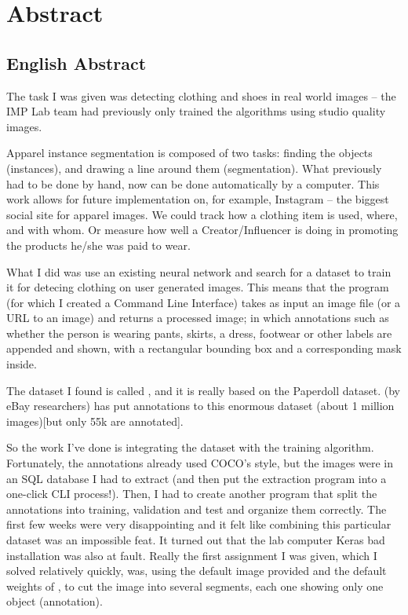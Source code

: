 \chapter*{Abstract}
\section*{English Abstract}

The task I was given was detecting clothing and shoes in real world images -- the IMP Lab team had previously only trained the algorithms using studio quality images.

Apparel instance segmentation is composed of two tasks: finding the objects (instances), and drawing a line around them (segmentation). What previously had to be done by hand, now can be done automatically by a computer. This work allows for future implementation on, for example, Instagram -- the biggest social site for apparel images. We could track how a clothing item is used, where, and with whom. Or measure how well a Creator/Influencer is doing in promoting the products he/she was paid to wear.

What I did was use an existing neural network and search for a dataset to train it for detecing clothing on user generated images. This means that the program (for which I created a Command Line Interface) takes as input an image file (or a URL to an image) and returns a processed image; in which annotations such as whether the person is wearing pants, skirts, a dress, footwear or other labels are appended and shown, with a rectangular bounding box and a corresponding mask inside.

The dataset I found is called \modanet, and it is really based on the Paperdoll dataset. \modanet (by eBay researchers) has put annotations to this enormous dataset (about 1 million images)[but only 55k are annotated].

So the work I've done is integrating the dataset with the training algorithm. Fortunately, the \modanet annotations already used COCO's style, but the images were in an SQL database I had to extract (and then put the extraction program into a one-click CLI process!).
Then, I had to create another program that split the annotations into training, validation and test and organize them correctly. The first few weeks were very disappointing and it felt like combining this particular dataset was an impossible feat. It turned out that the lab computer Keras bad installation was also at fault.
Really the first assignment I was given, which I solved relatively quickly, was, using the default image provided and the default weights of \maskrcnn, to cut the image into several segments, each one showing only one object (annotation).

